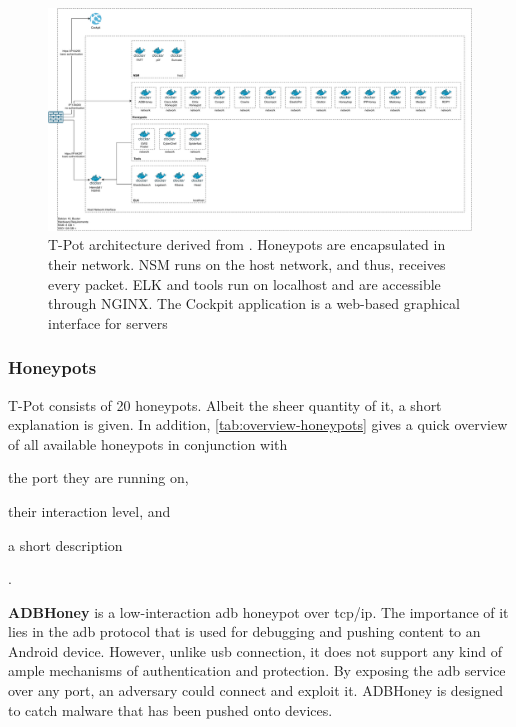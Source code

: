 \begin{figure}
    \centering
    \includegraphics[width=\textwidth]{figures/tpot-architecture.pdf}
    \caption[T-Pot architecture]{
        T-Pot architecture derived from \cite{tpot2021}.
        Honeypots are encapsulated in their network.
        NSM runs on the host network, and thus, receives every packet.
        ELK and tools run on localhost and are accessible through NGINX.
        The Cockpit application is a web-based graphical interface for servers
    }
    \label{fig:overview-tpot}
\end{figure}

\subsubsection{Honeypots}

T-Pot consists of 20 honeypots.
Albeit the sheer quantity of it, a short explanation is given.
In addition, \autoref{tab:overview-honeypots} gives a quick overview of all available honeypots in conjunction with
\begin{enumerate*}[label=(\roman*)]
    \item the port they are running on,
    \item their interaction level, and
    \item a short description
\end{enumerate*}.

\textbf{ADBHoney} \cite{adbhoney2021} is a low-interaction \ac{adb} honeypot over \ac{tcp}/\ac{ip}.
The importance of it lies in the \ac{adb} protocol that is used for debugging and pushing content to an Android device.
However, unlike \ac{usb} connection, it does not support any kind of ample mechanisms of authentication and protection.
By exposing the \ac{adb} service over any port, an adversary could connect and exploit it.
ADBHoney is designed to catch malware that has been pushed onto devices.


